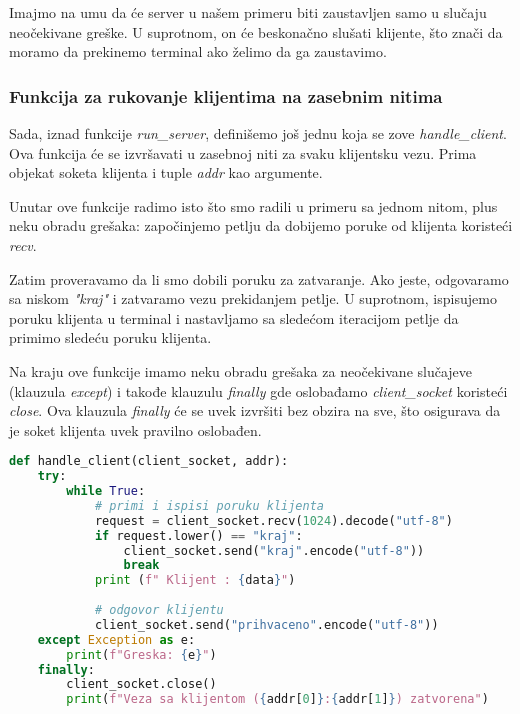 \vspace{0.5cm}

Imajmo na umu da će server u našem primeru biti zaustavljen samo u slučaju neočekivane greške. U suprotnom, on će beskonačno slušati klijente, što znači da moramo da prekinemo terminal ako želimo da ga zaustavimo.

\subsubsection{Funkcija za rukovanje klijentima na zasebnim nitima}

Sada, iznad funkcije \emph{run\_server}, definišemo još jednu koja se zove \emph{handle\_client}. Ova funkcija će se izvršavati u zasebnoj niti za svaku klijentsku vezu. Prima objekat soketa klijenta i tuple \emph{addr} kao argumente.

Unutar ove funkcije radimo isto što smo radili u primeru sa jednom nitom, plus neku obradu grešaka: započinjemo petlju da dobijemo poruke od klijenta koristeći \emph{recv}.

Zatim proveravamo da li smo dobili poruku za zatvaranje. Ako jeste, odgovaramo sa niskom \emph{"kraj"} i zatvaramo vezu prekidanjem petlje. U suprotnom, ispisujemo poruku klijenta u terminal i nastavljamo sa sledećom iteracijom petlje da primimo sledeću poruku klijenta.

Na kraju ove funkcije imamo neku obradu grešaka za neočekivane slučajeve (klauzula \emph{except}) i takođe klauzulu \emph{finally} gde oslobađamo \emph{client\_socket} koristeći \emph{close}. Ova klauzula \emph{finally} će se uvek izvršiti bez obzira na sve, što osigurava da je soket klijenta uvek pravilno oslobađen.

\vspace{0.5cm}

\begin{lstlisting}[language = Python]
    def handle_client(client_socket, addr):
    try:
        while True:
            # primi i ispisi poruku klijenta
            request = client_socket.recv(1024).decode("utf-8")
            if request.lower() == "kraj":
                client_socket.send("kraj".encode("utf-8"))
                break
            print (f" Klijent : {data}")
            
            # odgovor klijentu
            client_socket.send("prihvaceno".encode("utf-8"))
    except Exception as e:
        print(f"Greska: {e}")
    finally:
        client_socket.close()
        print(f"Veza sa klijentom ({addr[0]}:{addr[1]}) zatvorena")
\end{lstlisting}


